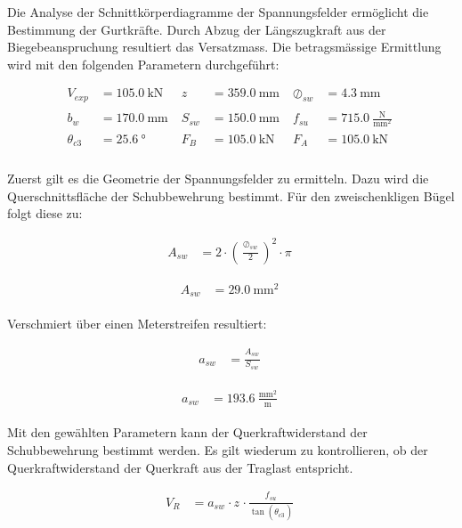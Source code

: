 \documentclass[
  11pt,
  letterpaper,
]{scrreprt}
\begin{document}
Die Analyse der Schnittkörperdiagramme der Spannungsfelder ermöglicht
die Bestimmung der Gurtkräfte. Durch Abzug der Längszugkraft aus der
Biegebeanspruchung resultiert das Versatzmass. Die betragsmässige
Ermittlung wird mit den folgenden Parametern durchgeführt:

$$
\begin{aligned}
V_{exp_{_{}}} &= 105.0\ \mathrm{kN} \; 
 &z_{_{}} &= 359.0\ \mathrm{mm} \; 
 &\oslash_{sw_{_{}}} &= 4.3\ \mathrm{mm} \; 
\\[11pt]
 b_{w_{_{}}} &= 170.0\ \mathrm{mm} \; 
 &S_{sw_{_{}}} &= 150.0\ \mathrm{mm} \; 
 &f_{su_{_{}}} &= 715.0\ \frac{\mathrm{N}}{\mathrm{mm}^{2}} \; 
\\[11pt]
 \theta_{c3_{_{}}} &= 25.6\ \mathrm{°} \; 
 &F_{B} &= 105.0\ \mathrm{kN} \; 
 &F_{A} &= 105.0\ \mathrm{kN} \; 
\\[11pt]
\end{aligned}
$$

Zuerst gilt es die Geometrie der Spannungsfelder zu ermitteln. Dazu wird
die Querschnittsfläche der Schubbewehrung bestimmt. Für den
zweischenkligen Bügel folgt diese zu:

$$
\begin{aligned}
A_{sw_{_{}}} &= 2 \cdot \left( \frac{ \oslash_{sw_{_{}}} }{ 2 } \right) ^{ 2 } \cdot \pi \; 
\end{aligned}
$$

$$
\begin{aligned}
A_{sw_{_{}}} &= 29.0\ \mathrm{mm}^{2} \;
\end{aligned}
$$

Verschmiert über einen Meterstreifen resultiert:

$$
\begin{aligned}
a_{sw_{_{}}} &= \frac{ A_{sw_{_{}}} }{ S_{sw_{_{}}} } \; 
\end{aligned}
$$

$$
\begin{aligned}
a_{sw_{_{}}} &= 193.6\ \frac{\mathrm{mm}^{2}}{\mathrm{m}} \;
\end{aligned}
$$

Mit den gewählten Parametern kann der Querkraftwiderstand der
Schubbewehrung bestimmt werden. Es gilt wiederum zu kontrollieren, ob
der Querkraftwiderstand der Querkraft aus der Traglast entspricht.

$$
\begin{aligned}
V_{R_{_{}}} &= a_{sw_{_{}}} \cdot z_{_{}} \cdot \frac{ f_{su_{_{}}} }{ \tan \left( \theta_{c3_{_{}}} \right) } \; 
\end{aligned}
$$
\end{document}
